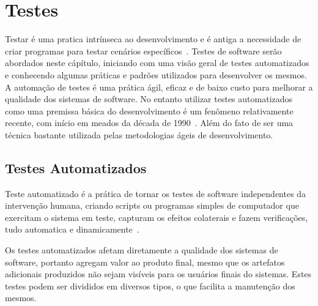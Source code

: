 \chapter{Testes}
\label{cap:testes}

Testar é uma pratica intrínseca ao desenvolvimento e é antiga a necessidade de
criar programas para testar cenários específicos~. Testes de software 
serão abordados neste cápítulo, iniciando com uma visão geral de testes 
automatizados e conhecendo algumas práticas e padrões utilizados para desenvolver
os mesmos.
%
A automação de testes é uma prática ágil, eficaz e de baixo custo para melhorar
a qualidade dos sistemas de software. No entanto utilizar testes automatizados 
como uma premissa básica do desenvolvimento é um fenômeno relativamente recente, 
com início em meados  da década de 1990~\cite{cotter1995}.
%
Além do fato de ser uma técnica bastante utilizada pelas metodologias ágeis
de desenvolvimento.


\section{Testes Automatizados}

Teste automatizado é a prática de tornar os testes de software independentes da
intervenção humana, criando scripts ou programas simples de computador que exercitam 
o sistema em teste, capturam os efeitos colaterais e fazem verificações, tudo 
automatica e dinamicamente~\cite{meszaros2007}.

Os testes automatizados afetam diretamente a qualidade dos sistemas de software,
portanto agregam valor  ao produto final, mesmo que os artefatos adicionais
produzidos não sejam visíveis para os usuários finais do sistemas.
%
Estes testes podem ser divididos em diversos tipos, o que facilita a manutenção 
dos mesmos.

